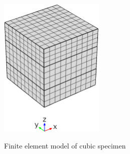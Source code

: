 \documentclass[review]{elsarticle}
\begin{document}
\begin{figure}[h]
\centering
\includegraphics[width=5cm]{CubeFEM.eps}
\label{fig:cubemesh}
\caption{\label{fig:cubemesh} Finite element model of cubic specimen}
\end{figure}
\end{document}
